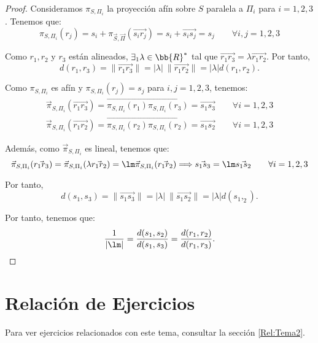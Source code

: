 \begin{proof}
    Consideramos $\pi_{S,\Pi_i}$ la proyección afín sobre $S$ paralela a $\Pi_i$ para $i=1,2,3$. Tenemos que:
    \begin{equation*}
        \pi_{S,\Pi_i}(r_j) = s_i + \pi_{\vec{S}, \vec{\Pi}}(\vec{s_ir_j}) = s_i+\vec{s_is_j} = s_j \qquad \forall i,j=1,2,3
    \end{equation*}

    Como $r_1,r_2$ y $r_3$ están alineados, $\exists_1 \lambda\in \bb{R}^\ast$ tal que $\vec{r_1r_3} = \lambda\vec{r_1r_2}$. Por tanto,
    \begin{equation*}
        d(r_1,r_3) = \|\vec{r_1r_3}\| = |\lambda|~\|\vec{r_1r_2}\| = |\lambda|d(r_1,r_2).
    \end{equation*}

    Como $\pi_{S,\Pi_i}$ es afín y $\pi_{S,\Pi_i}(r_j)=s_j$ para $i,j=1,2,3$, tenemos:
    \begin{gather*}
        \vec{\pi}_{S,\Pi_i}(\vec{r_1r_3}) = \vec{\pi_{S,\Pi_i}(r_1)\pi_{S,\Pi_i}(r_3)} = \vec{s_1s_3} \qquad \forall i=1,2,3 \\
        \vec{\pi}_{S,\Pi_i}(\vec{r_1r_2}) = \vec{\pi_{S,\Pi_i}(r_2)\pi_{S,\Pi_i}(r_2)} = \vec{s_1s_2} \qquad \forall i=1,2,3
    \end{gather*}

    Además, como $\vec{\pi}_{S,\Pi_i}$ es lineal, tenemos que:
    \begin{equation*}
        \vec{\pi}_{S,\Pi_i}(\vec{r_1r_3}) = \vec{\pi}_{S,\Pi_i}(\lambda\vec{r_1r_2})
        = \lm\vec{\pi}_{S,\Pi_i}(\vec{r_1r_2}) \Longrightarrow \vec{s_1s_3} = \lm \vec{s_1s_2} \qquad \forall i=1,2,3
    \end{equation*}

    Por tanto,
    \begin{equation*}
        d(s_1,s_3) = \|\vec{s_1s_3}\| = |\lambda|~\|\vec{s_1s_2}\| = |\lambda|d(s_1,_2).
    \end{equation*}

    Por tanto, tenemos que:
    \begin{equation*}
        \frac{1}{|\lm|}=
        \frac{d(s_1, s_2)}{d(s_1,s_3)} = \frac{d(r_1,r_2)}{d(r_1,r_3)}.
    \end{equation*}
\end{proof}


\section{Relación de Ejercicios}

Para ver ejercicios relacionados con este tema, consultar la sección \ref{Rel:Tema2}.